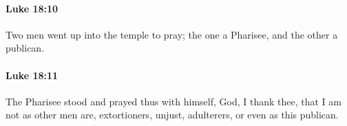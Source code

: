 		\paragraph{Luke 18:10} %
			\label{LUKE-18-10}

			Two men went up into the temple to pray; the one a Pharisee, and the other a publican.

			\begin{framed}
			\scriptsize
				\begin{compactdesc}
					\item[SBLG] 
				\end{compactdesc}
			\end{framed}

		\paragraph{Luke 18:11} %
			\label{LUKE-18-11}

			The Pharisee stood and prayed thus with himself, God, I thank thee, that I am not as other men are, extortioners, unjust, adulterers, or even as this publican.

